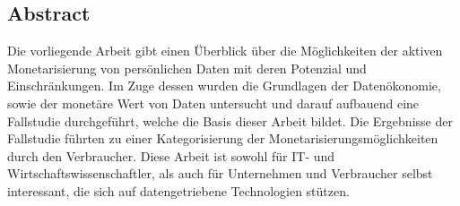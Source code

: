 \thispagestyle{empty}
\vspace*{5cm}
\begin{center}
\begin{minipage}{0.9\textwidth}
\chapter*{Abstract}

Die vorliegende Arbeit gibt einen Überblick über die Möglichkeiten der aktiven Monetarisierung von persönlichen Daten mit deren Potenzial und Einschränkungen. Im Zuge dessen wurden die Grundlagen der Datenökonomie, sowie der monetäre Wert von Daten untersucht und darauf aufbauend eine Fallstudie durchgeführt, welche die Basis dieser Arbeit bildet. Die Ergebnisse der Fallstudie führten zu einer Kategorisierung der Monetarisierungsmöglichkeiten durch den Verbraucher. Diese Arbeit ist sowohl für IT- und Wirtschaftswissenschaftler, als auch für Unternehmen und Verbraucher selbst interessant, die sich auf datengetriebene Technologien stützen.

\vspace*{1.5cm}
\end{minipage}
\end{center}
\clearpage